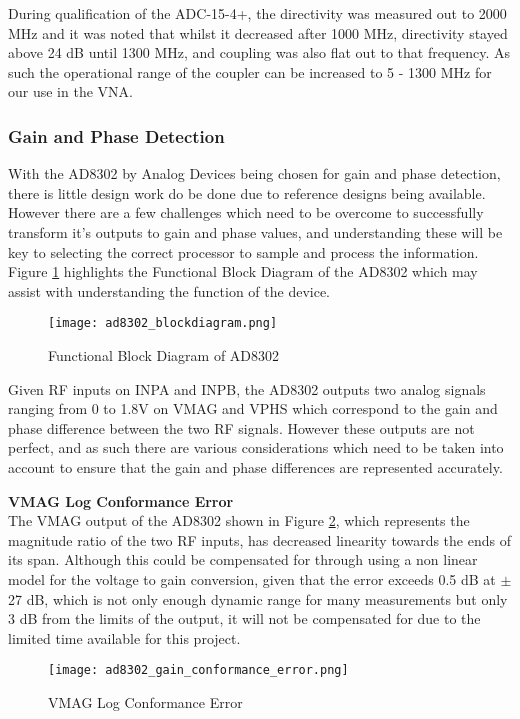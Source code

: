 During qualification of the ADC-15-4+, the directivity was measured out to 2000 MHz and it was noted that whilst it decreased after 1000 MHz, directivity stayed above 24 dB until 1300 MHz, and coupling was also flat out to that frequency. As such the operational range of the coupler can be increased to 5 - 1300 MHz for our use in the VNA. 

\subsubsection{Gain and Phase Detection}
With the AD8302 by Analog Devices being chosen for gain and phase detection, there is little design work do be done due to reference designs being available. However there are a few challenges which need to be overcome to successfully transform it's outputs to gain and phase values, and understanding these will be key to selecting the correct processor to sample and process the information. Figure \ref{fig:ad8302_block_diag} highlights the Functional Block Diagram of the AD8302 which may assist with understanding the function of the device. 

\begin{figure}[H]
	\centering
	\texttt{[image: ad8302\_blockdiagram.png]}
	\caption{Functional Block Diagram of AD8302}
	\label{fig:ad8302_block_diag}
\end{figure}

Given RF inputs on INPA and INPB, the AD8302 outputs two analog signals ranging from 0 to 1.8V on VMAG and VPHS which correspond to the gain and phase difference between the two RF signals. However these outputs are not perfect, and as such there are various considerations which need to be taken into account to ensure that the gain and phase differences are represented accurately. 

\textbf{VMAG Log Conformance Error} \\
The VMAG output of the AD8302 shown in Figure \ref{fig:ad8302_VMAG_conformance}, which represents the magnitude ratio of the two RF inputs, has decreased linearity towards the ends of its span. Although this could be compensated for through using a non linear model for the voltage to gain conversion, given that the error exceeds 0.5 dB at $\pm$27 dB, which is not only enough dynamic range for many measurements but only 3 dB from the limits of the output, it will not be compensated for due to the limited time available for this project.  
\begin{figure}[H]
	\centering
	\texttt{[image: ad8302\_gain\_conformance\_error.png]}
	\caption{VMAG Log Conformance Error}
	\label{fig:ad8302_VMAG_conformance}
\end{figure}

